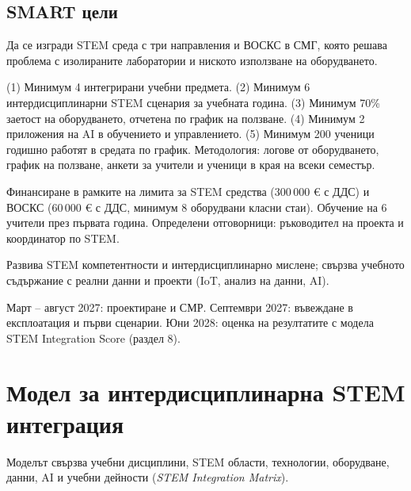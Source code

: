 \documentclass[11pt,a4paper]{article}
\begin{document}
\subsection{SMART цели}

\begin{description}[leftmargin=3cm, style=nextline]
  \item[S -- Specific] Да се изгради STEM среда с три направления и ВОСКС в СМГ, която решава проблема с изолираните лаборатории и ниското използване на оборудването.
  \item[M -- Measurable] (1) Минимум 4 интегрирани учебни предмета. (2) Минимум 6 интердисциплинарни STEM сценария за учебната година. (3) Минимум 70\% заетост на оборудването, отчетена по график на ползване. (4) Минимум 2 приложения на AI в обучението и управлението. (5) Минимум 200 ученици годишно работят в средата по график. Методология: логове от оборудването, график на ползване, анкети за учители и ученици в края на всеки семестър.
  \item[A -- Achievable] Финансиране в рамките на лимита за STEM средства (300\,000 € с ДДС) и ВОСКС (60\,000 € с ДДС, минимум 8 оборудвани класни стаи). Обучение на 6 учители през първата година. Определени отговорници: ръководител на проекта и координатор по STEM.
  \item[R -- Relevant] Развива STEM компетентности и интердисциплинарно мислене; свързва учебното съдържание с реални данни и проекти (IoT, анализ на данни, AI).
  \item[T -- Time-bound] Март – август 2027: проектиране и СМР. Септември 2027: въвеждане в експлоатация и първи сценарии. Юни 2028: оценка на резултатите с модела STEM Integration Score (раздел 8).
\end{description}

\section{Модел за интердисциплинарна STEM интеграция}

Моделът свързва учебни дисциплини, STEM области, технологии, оборудване, данни, AI и учебни дейности (\emph{STEM Integration Matrix}).
\end{document}
